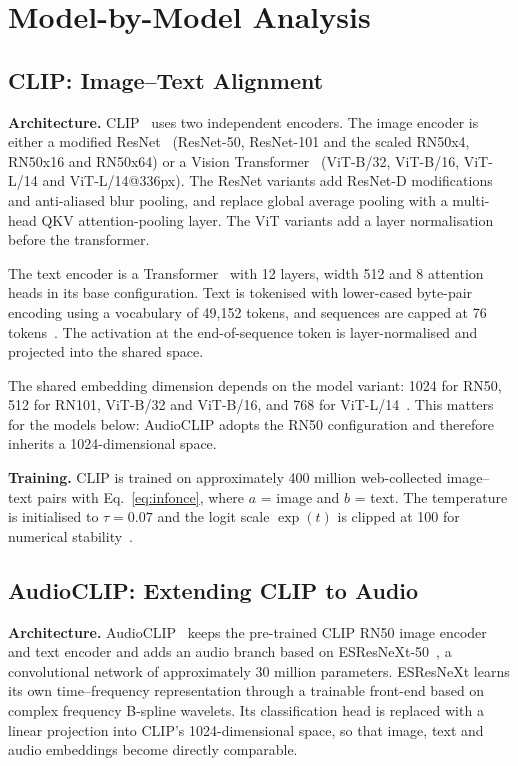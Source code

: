 \documentclass[pdflatex,sn-mathphys-num]{sn-jnl}%
\theoremstyle{thmstyleone}%
\theoremstyle{thmstyletwo}%
\theoremstyle{thmstylethree}%
\begin{document}
\section{Model-by-Model Analysis}\label{sec4}

\subsection{CLIP: Image--Text Alignment}\label{subsec4.1}

\textbf{Architecture.} CLIP~\cite{radford2021clip} uses two independent encoders. The image encoder is either a modified ResNet~\cite{he2016resnet} (ResNet-50, ResNet-101 and the scaled RN50x4, RN50x16 and RN50x64) or a Vision Transformer~\cite{dosovitskiy2021vit} (ViT-B/32, ViT-B/16, ViT-L/14 and ViT-L/14@336px). The ResNet variants add ResNet-D modifications and anti-aliased blur pooling, and replace global average pooling with a multi-head QKV attention-pooling layer. The ViT variants add a layer normalisation before the transformer.

The text encoder is a Transformer~\cite{vaswani2017attention} with 12 layers, width 512 and 8 attention heads in its base configuration. Text is tokenised with lower-cased byte-pair encoding using a vocabulary of 49,152 tokens, and sequences are capped at 76 tokens~\cite{radford2021clip}. The activation at the end-of-sequence token is layer-normalised and projected into the shared space.

The shared embedding dimension depends on the model variant: 1024 for RN50, 512 for RN101, ViT-B/32 and ViT-B/16, and 768 for ViT-L/14~\cite{radford2021clip}. %
This matters for the models below: AudioCLIP adopts the RN50 configuration and therefore inherits a 1024-dimensional space.

\textbf{Training.} CLIP is trained on approximately 400 million web-collected image--text pairs with Eq.~\eqref{eq:infonce}, where $a$ = image and $b$ = text. The temperature is initialised to $\tau = 0.07$ and the logit scale $\exp(t)$ is clipped at 100 for numerical stability~\cite{radford2021clip}.

\subsection{AudioCLIP: Extending CLIP to Audio}\label{subsec4.2}

\textbf{Architecture.} AudioCLIP~\cite{guzhov2022audioclip} keeps the pre-trained CLIP RN50 image encoder and text encoder and adds an audio branch based on ESResNeXt-50~\cite{guzhov2021esresnext}, a convolutional network of approximately 30 million parameters. ESResNeXt learns its own time--frequency representation through a trainable front-end based on complex frequency B-spline wavelets. Its classification head is replaced with a linear projection into CLIP's 1024-dimensional space, so that image, text and audio embeddings become directly comparable.
\end{document}
